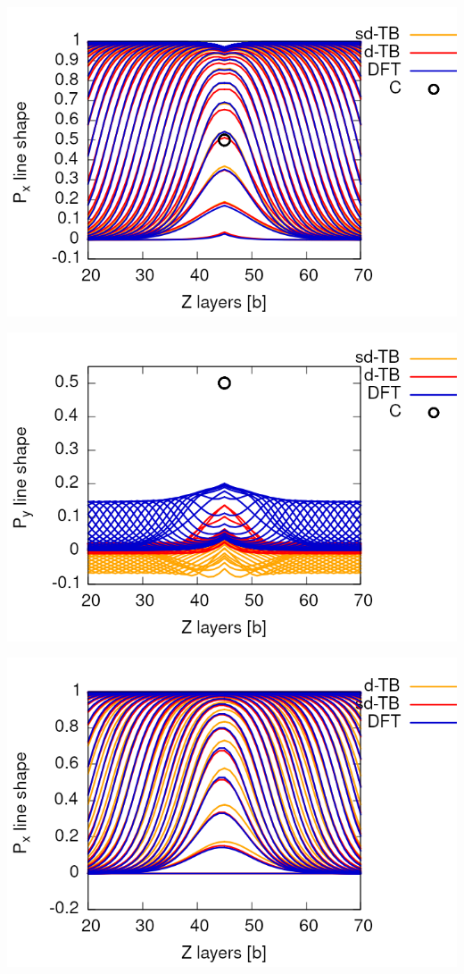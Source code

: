 \documentclass[a4paper,11pt]{article}
\begin{document}
\begin{center}
\includegraphics[width=.9\linewidth]{Images/lineshape_with_carbon_combined.png}
\end{center}

\begin{center}
\includegraphics[width=.9\linewidth]{Images/lineshape_with_carbon_combined_Py.png}
\end{center}



\begin{center}
\includegraphics[width=.9\linewidth]{Images/img_comparison_of_images_shift_tol_1e-3.png}
\end{center}
\end{document}
